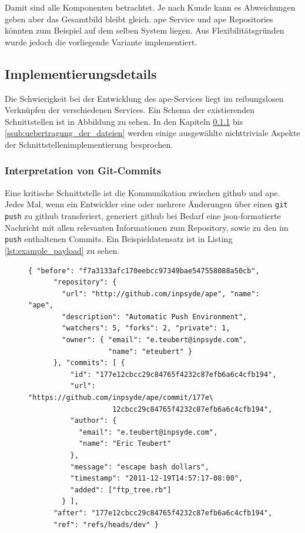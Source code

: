 Damit sind alle Komponenten betrachtet. Je nach Kunde kann es Abweichungen geben aber das Gesamtbild bleibt gleich. \gls{ape} Service und \gls{ape} Repositories könnten zum Beispiel auf dem selben System liegen. Aus Flexibilitätsgründen wurde jedoch die vorliegende Variante implementiert.



\subsection{Implementierungsdetails} %
\label{sub:implementierungsdetails}

Die Schwierigkeit bei der Entwicklung des \gls{ape}-Services liegt im reibungslosen Verknüpfen der verschiedenen Services. Ein Schema der existierenden Schnittstellen ist in Abbildung zu sehen. In den Kapiteln \ref{ssub:interpretation_von_git_commits} bis \ref{ssub:uebertragung_der_dateien} werden einige ausgewählte nichttriviale Aspekte der Schnittstellenimplementierung besprochen.

\subsubsection{Interpretation von Git-Commits} %
\label{ssub:interpretation_von_git_commits}

Eine kritische Schnittstelle ist die Kommunikation zwischen \gls{github} und \gls{ape}. Jedes Mal, wenn ein Entwickler eine oder mehrere Änderungen über einen \lstinline!git push! zu \gls{github} transferiert, generiert \gls{github} bei Bedarf eine \gls{json}-formatierte Nachricht mit allen relevanten Informationen zum Repository, sowie zu den im \lstinline!push! enthaltenen Commits. Ein Beispieldatensatz ist in Listing \ref{lst:example_payload} zu sehen.

\begin{figure}
	\begin{lstlisting}[caption=Beispiel-Webhook von \gls{github},label={lst:example_payload}]
	{ "before": "f7a3133afc170eebcc97349bae547558088a50cb",
	  "repository": {
	    "url": "http://github.com/inpsyde/ape", "name": "ape",
	    "description": "Automatic Push Environment",
	    "watchers": 5, "forks": 2, "private": 1,
	    "owner": { "email": "e.teubert@inpsyde.com",
	               "name": "eteubert" }
	  }, "commits": [ {
	      "id": "177e12cbcc29c84765f4232c87efb6a6c4cfb194",
	      "url": "https://github.com/inpsyde/ape/commit/177e\
					12cbcc29c84765f4232c87efb6a6c4cfb194",
	      "author": {
	        "email": "e.teubert@inpsyde.com",
	        "name": "Eric Teubert"
	      },
	      "message": "escape bash dollars",
	      "timestamp": "2011-12-19T14:57:17-08:00",
	      "added": ["ftp_tree.rb"]
	    } ],
	  "after": "177e12cbcc29c84765f4232c87efb6a6c4cfb194",
	  "ref": "refs/heads/dev" }
	\end{lstlisting}
\end{figure}

